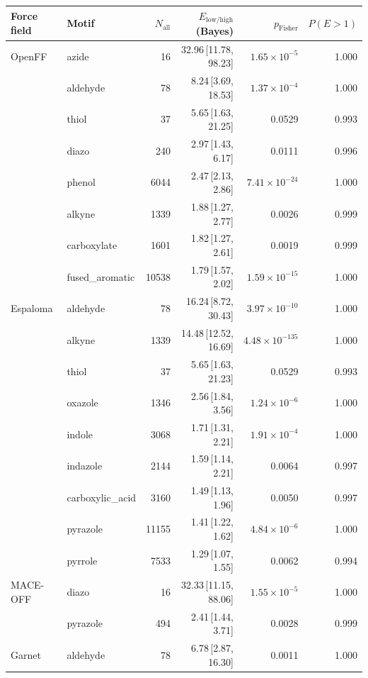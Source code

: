 \begin{table}[t]
  \centering
  \small
  \setlength{\tabcolsep}{6pt}
  \renewcommand{\arraystretch}{1.15}
  \begin{tabular}{llrrrr}
    \hline
    Force field & Motif & $N_\mathrm{all}$ & $E_{\mathrm{low/high}}$ (Bayes) & $p_\mathrm{Fisher}$ & $P(E>1)$ \\
    \hline
    OpenFF & azide & 16 & 32.96\,[11.78, 98.23] & $1.65\times 10^{-5}$ & 1.000 \\
      & aldehyde & 78 & 8.24\,[3.69, 18.53] & $1.37\times 10^{-4}$ & 1.000 \\
      & thiol & 37 & 5.65\,[1.63, 21.25] & 0.0529 & 0.993 \\
      & diazo & 240 & 2.97\,[1.43, 6.17] & 0.0111 & 0.996 \\
      & phenol & 6044 & 2.47\,[2.13, 2.86] & $7.41\times 10^{-24}$ & 1.000 \\
      & alkyne & 1339 & 1.88\,[1.27, 2.77] & 0.0026 & 0.999 \\
      & carboxylate & 1601 & 1.82\,[1.27, 2.61] & 0.0019 & 0.999 \\
      & fused\_aromatic & 10538 & 1.79\,[1.57, 2.02] & $1.59\times 10^{-15}$ & 1.000 \\
    \hline
    Espaloma & aldehyde & 78 & 16.24\,[8.72, 30.43] & $3.97\times 10^{-10}$ & 1.000 \\
      & alkyne & 1339 & 14.48\,[12.52, 16.69] & $4.48\times 10^{-135}$ & 1.000 \\
      & thiol & 37 & 5.65\,[1.63, 21.23] & 0.0529 & 0.993 \\
      & oxazole & 1346 & 2.56\,[1.84, 3.56] & $1.24\times 10^{-6}$ & 1.000 \\
      & indole & 3068 & 1.71\,[1.31, 2.21] & $1.91\times 10^{-4}$ & 1.000 \\
      & indazole & 2144 & 1.59\,[1.14, 2.21] & 0.0064 & 0.997 \\
      & carboxylic\_acid & 3160 & 1.49\,[1.13, 1.96] & 0.0050 & 0.997 \\
      & pyrazole & 11155 & 1.41\,[1.22, 1.62] & $4.84\times 10^{-6}$ & 1.000 \\
      & pyrrole & 7533 & 1.29\,[1.07, 1.55] & 0.0062 & 0.994 \\
    \hline
    MACE-OFF & diazo & 16 & 32.33\,[11.15, 88.06] & $1.55\times 10^{-5}$ & 1.000 \\
      & pyrazole & 494 & 2.41\,[1.44, 3.71] & 0.0028 & 0.999 \\
    \hline
    Garnet & aldehyde & 78 & 6.78\,[2.87, 16.30] & 0.0011 & 1.000 \\

\end{tabular}
\end{table}
